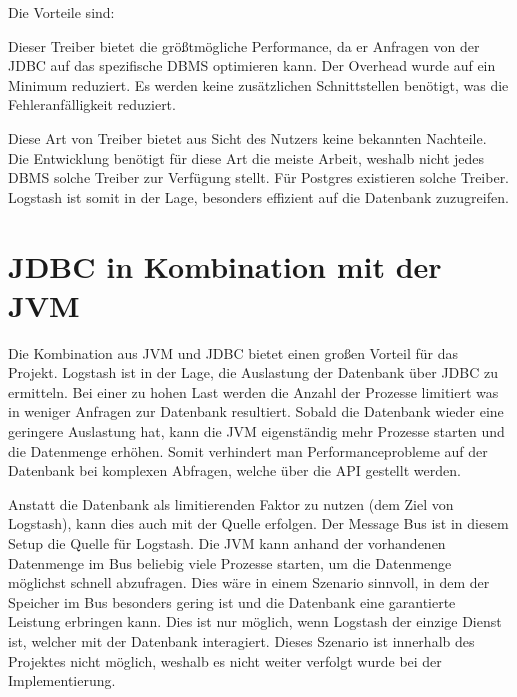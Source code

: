 Die Vorteile sind:

\begin{outline}
  \1 Dieser Treiber bietet die größtmögliche Performance, da er Anfragen von
  der JDBC auf das spezifische DBMS optimieren kann.
  \1 Der Overhead wurde auf ein Minimum reduziert.
  \1 Es werden keine zusätzlichen Schnittstellen benötigt, was die
  Fehleranfälligkeit reduziert.
\end{outline}

Diese Art von Treiber bietet aus Sicht des Nutzers keine bekannten Nachteile.
Die Entwicklung benötigt für diese Art die meiste Arbeit, weshalb nicht jedes
DBMS solche Treiber zur Verfügung stellt. Für Postgres existieren solche
Treiber. Logstash ist somit in der Lage, besonders effizient auf die Datenbank
zuzugreifen.
\tm%

\section{JDBC in Kombination mit der JVM}
Die Kombination aus JVM und JDBC bietet einen großen Vorteil für das Projekt.
Logstash ist in der Lage, die Auslastung der Datenbank über JDBC zu ermitteln.
Bei einer zu hohen Last werden die Anzahl der Prozesse limitiert was in weniger
Anfragen zur Datenbank resultiert. Sobald die Datenbank wieder eine geringere
Auslastung hat, kann die JVM eigenständig mehr Prozesse starten und die
Datenmenge erhöhen. Somit verhindert man Performanceprobleme auf der Datenbank
bei komplexen Abfragen, welche über die API gestellt werden.

Anstatt die Datenbank als limitierenden Faktor zu nutzen (dem Ziel von
Logstash), kann dies auch mit der Quelle erfolgen. Der Message Bus ist
in diesem Setup die Quelle für Logstash. Die JVM kann anhand der vorhandenen
Datenmenge im Bus beliebig viele Prozesse starten, um die Datenmenge möglichst
schnell abzufragen. Dies wäre in einem Szenario sinnvoll, in dem der Speicher
im Bus besonders gering ist und die Datenbank eine garantierte Leistung
erbringen kann. Dies ist nur möglich, wenn Logstash der einzige Dienst ist,
welcher mit der Datenbank interagiert. Dieses Szenario ist innerhalb des
Projektes nicht möglich, weshalb es nicht weiter verfolgt wurde bei der
Implementierung.
\tm%


